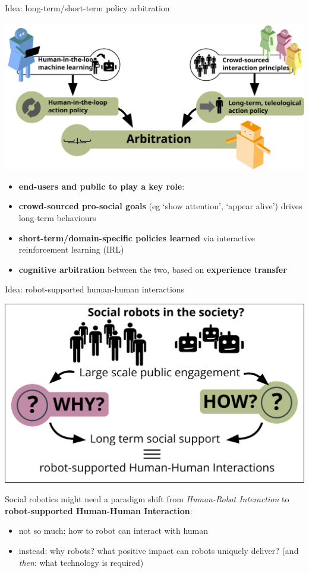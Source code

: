 \documentclass[xcolor=table]{beamer}
\begin{document}
\begin{frame}{Idea: long-term/short-term policy arbitration}
    \begin{center}
        \includegraphics[width=0.8\linewidth]{architectures/arbitration}
    \end{center}

    \begin{itemize}
            \scriptsize
        \item \textbf{end-users and public to play a key role}:
        \item \textbf{crowd-sourced pro-social goals} (eg `show attention', `appear
            alive') drives long-term behaviours
        \item \textbf{short-term/domain-specific policies learned} via
            interactive reinforcement learning (IRL)
        \item \textbf{cognitive arbitration} between the two, based on
            \textbf{experience transfer}
    \end{itemize}
\end{frame}

\begin{frame}{Idea: robot-supported human-human interactions}
    \begin{center}
        \includegraphics[width=0.5\linewidth]{figs/rHHI/rHHI}
    \end{center}

    Social robotics might need a paradigm shift from \emph{Human-Robot
    Interaction} to \textbf{robot-supported
    Human-Human Interaction}:
    \begin{itemize}
        \item not so much: how to robot can interact with human
        \item instead: why robots? what positive impact can robots uniquely
            deliver? (and \emph{then}: what technology is
            required)
    \end{itemize}
\end{frame}
\end{document}
